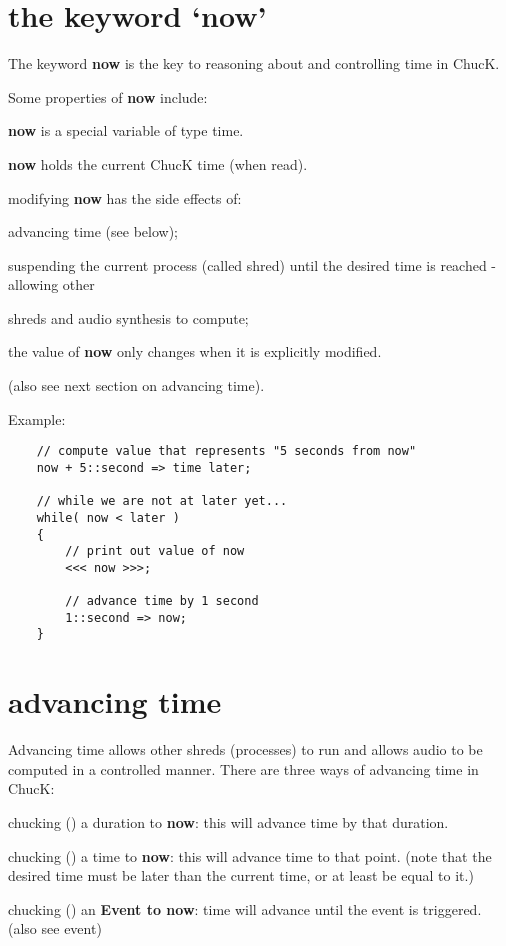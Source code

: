 \section{the keyword `now'}

The keyword {\bf now} is the key to reasoning about and controlling time in ChucK.

Some properties of {\bf now} include:
\begin{chuckitemize}
\item {\bf now} is a special variable of type time.
\item {\bf now} holds the current ChucK time (when read).
\item modifying {\bf now} has the side effects of:
	\item advancing time (see below);
	\item suspending the current process (called shred) until the desired time is reached - 	allowing other \item shreds and audio synthesis to compute;
\item the value of {\bf now} only changes when it is explicitly modified.
\end{chuckitemize}
(also see next section on advancing time).

Example:
\begin{verbatim}
    // compute value that represents "5 seconds from now"
    now + 5::second => time later;

    // while we are not at later yet...
    while( now < later )
    {
        // print out value of now
        <<< now >>>;

        // advance time by 1 second
        1::second => now;
    }
\end{verbatim}

\section{advancing time}

Advancing time allows other shreds (processes) to run and allows audio to be computed in a controlled manner. There are three ways of advancing time in ChucK:

\begin{chuckitemize}
\item chucking (\chuckop) a duration to {\bf now}: this will advance time by that duration.
\item chucking (\chuckop) a time to {\bf now}: this will advance time to that point. (note that the desired time must be later than the current time, or at least be equal to it.)
\item chucking (\chuckop) an {\bf Event to now}: time will advance until the event is triggered. (also see event)
\end{chuckitemize}

